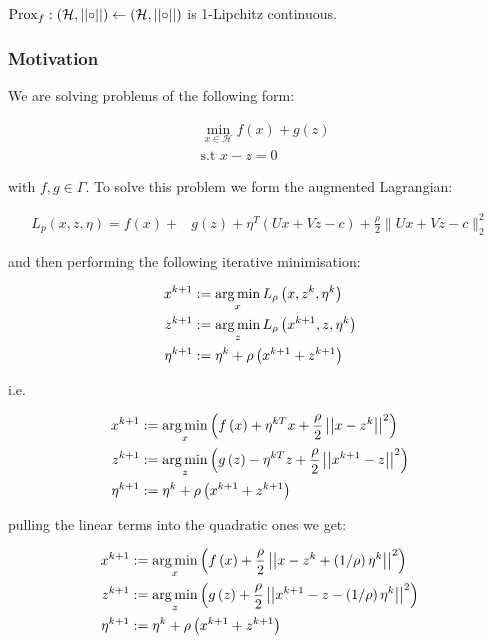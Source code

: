 \documentclass{article}
\begin{document}
\begin{theorem}[Moreau '65]
\( \mathrm{Prox}_f : \left(\mathcal{H}, \left|\left|\circ\right|\right|\right) \leftarrow \left(\mathcal{H}, \left|\left|\circ\right|\right|\right) \) is 1-Lipchitz continuous.
\end{theorem}

\subsubsection{Motivation}
We are solving problems of the following form:

\begin{align}
&\min_{x \in \mathcal{H}} f\left(x\right) + g\left(z\right)\\
&\text{s.t } x - z = 0
\end{align}

with \(f, g \in \Gamma\). To solve this problem we form the augmented Lagrangian: 

\begin{align*}
L_p\left(x, z, \eta\right) = f\left( x\right) +& g\left(z\right)+\eta^T\left(Ux+Vz-c\right) + \frac{\rho}{2}\|Ux+Vz-c\|_2^2
\end{align*}

and then performing the following iterative minimisation:

\begin{align}
x^{k+1} &:= \operatorname*{arg\,min}_{x} L_\rho\left(x,z^k,\eta^k\right)\\
z^{k+1} &:= \operatorname*{arg\,min}_{z} L_\rho\left(x^{k+1},z,\eta^k\right)\\
\eta^{k+1} &:= \eta^{k} + \rho \left(x^{k+1} + z^{k+1}\right)
\end{align}

i.e. 

\begin{align}
x^{k+1} &:= \operatorname*{arg\,min}_{x} \left( f\left(x\right) + \eta^{kT}x + \frac{\rho}{2}\left|\left|x - z^k\right|\right|^2 \right) \\
z^{k+1} &:= \operatorname*{arg\,min}_{z} \left( g\left(z\right) - \eta^{kT}z + \frac{\rho}{2}\left|\left|x^{k+1} - z\right|\right|^2 \right)\\
\eta^{k+1} &:= \eta^{k} + \rho \left(x^{k+1} + z^{k+1}\right)
\end{align}

pulling the linear terms into the quadratic ones we get:

\begin{align}
x^{k+1} &:= \operatorname*{arg\,min}_{x} \left( f\left(x\right) +  \frac{\rho}{2}\left|\left|x - z^k + \left(1/\rho\right)\eta^k\right|\right|^2 \right) \\
z^{k+1} &:= \operatorname*{arg\,min}_{z} \left( g\left(z\right) +  \frac{\rho}{2}\left|\left|x^{k+1} - z - \left(1/\rho\right)\eta^k\right|\right|^2 \right)\\
\eta^{k+1} &:= \eta^{k} + \rho \left(x^{k+1} + z^{k+1}\right)
\end{align}
\end{document}
